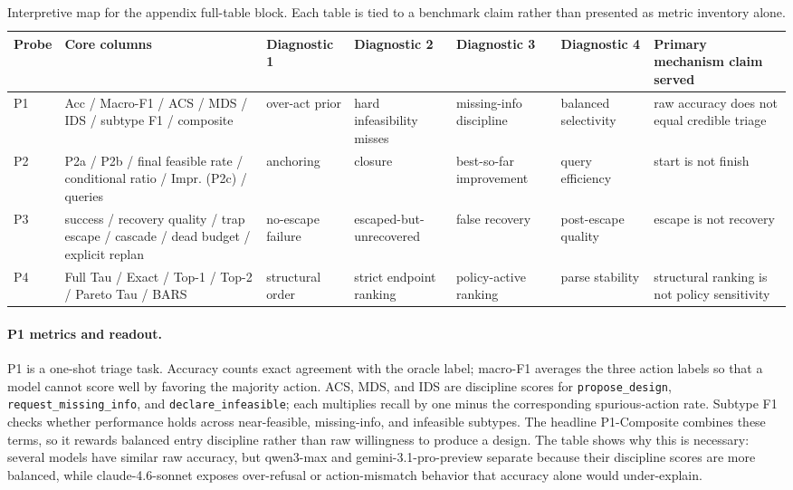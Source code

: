 \begin{table}[t]
\caption{Interpretive map for the appendix full-table block. Each table is tied to a benchmark claim rather than presented as metric inventory alone.}
\label{tab:appendix_fulltable_map}
\centering
\small
\begin{tabular}{lp{21mm}p{16mm}p{16mm}p{16mm}p{16mm}p{18mm}}
\toprule
Probe & Core columns & Diagnostic 1 & Diagnostic 2 & Diagnostic 3 & Diagnostic 4 & Primary mechanism claim served \\
\midrule
P1 & Acc / Macro-F1 / ACS / MDS / IDS / subtype F1 / composite & over-act prior & hard infeasibility misses & missing-info discipline & balanced selectivity & raw accuracy does not equal credible triage \\
P2 & P2a / P2b / final feasible rate / conditional ratio / Impr. (P2c) / queries & anchoring & closure & best-so-far improvement & query efficiency & start is not finish \\
P3 & success / recovery quality / trap escape / cascade / dead budget / explicit replan & no-escape failure & escaped-but-unrecovered & false recovery & post-escape quality & escape is not recovery \\
P4 & Full Tau / Exact / Top-1 / Top-2 / Pareto Tau / BARS & structural order & strict endpoint ranking & policy-active ranking & parse stability & structural ranking is not policy sensitivity \\
\bottomrule
\end{tabular}
\end{table}

\paragraph{P1 metrics and readout.}
P1 is a one-shot triage task. Accuracy counts exact agreement with the oracle label; macro-F1 averages the three action labels so that a model cannot score well by favoring the majority action. ACS, MDS, and IDS are discipline scores for \texttt{propose\_design}, \texttt{request\_missing\_info}, and \texttt{declare\_infeasible}; each multiplies recall by one minus the corresponding spurious-action rate. Subtype F1 checks whether performance holds across near-feasible, missing-info, and infeasible subtypes. The headline P1-Composite combines these terms, so it rewards balanced entry discipline rather than raw willingness to produce a design. The table shows why this is necessary: several models have similar raw accuracy, but qwen3-max and gemini-3.1-pro-preview separate because their discipline scores are more balanced, while claude-4.6-sonnet exposes over-refusal or action-mismatch behavior that accuracy alone would under-explain.

